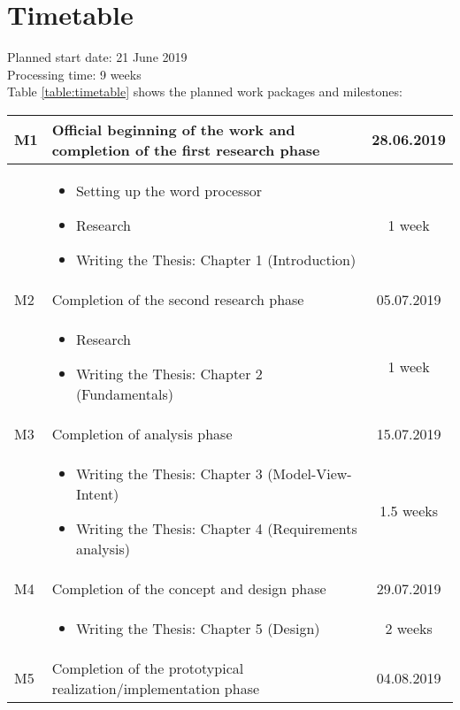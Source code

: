 \section{Timetable}
\label{sec:timetable}
\renewcommand{\arraystretch}{1.5}

Planned start date: 21 June 2019
\\
Processing time: 9 weeks
\\
Table \ref{table:timetable} shows the planned work packages and milestones:

\begin{flushleft}
	\begin{longtable}{ | l | p{11cm} | c |}
		\hline
		M1 & Official beginning of the work and completion of the first research phase & 28.06.2019 \\ 
		\hline
		& \begin{itemize}
			\item Setting up the word processor
			\item Research
			\item Writing the Thesis: Chapter 1 (Introduction)
			\end{itemize} & 1 week \\
		\hline
		M2 & Completion of the second research phase & 05.07.2019 \\ 
		\hline
		& \begin{itemize}
			\item Research
			\item Writing the Thesis: Chapter 2 (Fundamentals)
			\end{itemize} & 1 week \\
		\hline
		M3 & Completion of analysis phase & 15.07.2019 \\ 
		\hline
		& \begin{itemize}
			\item Writing the Thesis: Chapter 3 (Model-View-Intent)
			\item Writing the Thesis: Chapter 4 (Requirements analysis)
		\end{itemize} & 1.5 weeks \\
		\hline
		M4 & Completion of the concept and design phase & 29.07.2019 \\ 
		\hline
		& \begin{itemize}
			\item Writing the Thesis: Chapter 5 (Design)
		\end{itemize} & 2 weeks \\
		\hline
		M5 & Completion of the prototypical realization/implementation phase & 04.08.2019 \\ 

\end{longtable}
\end{flushleft}
